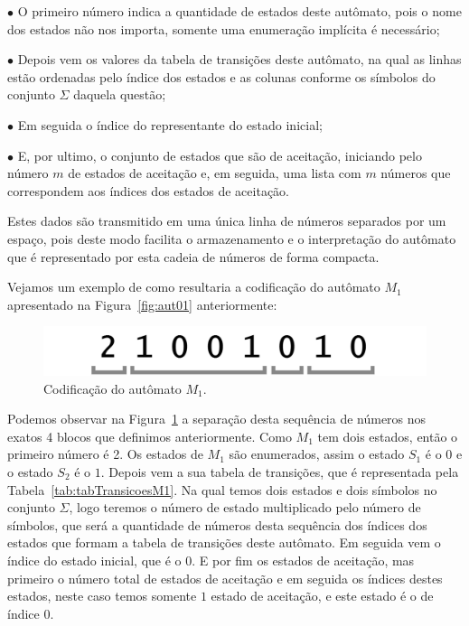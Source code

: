 \documentclass[
	12pt,				%
	openany,
	oneside,
	a4paper,			%
	english,			%
	brazil				%
	]{abntex2}
\begin{document}
\begin{alineas}
  \item[$\bullet$] O primeiro número indica a quantidade de estados deste autômato, pois o nome dos estados não nos importa, somente uma enumeração implícita é necessário;
  \item[$\bullet$] Depois vem os valores da tabela de transições deste autômato, na qual as linhas estão ordenadas pelo índice dos estados e as colunas conforme os símbolos do conjunto $\Sigma$ daquela questão;
  \item[$\bullet$] Em seguida o índice do representante do estado inicial;
  \item[$\bullet$] E, por ultimo, o conjunto de estados que são de aceitação, iniciando pelo número $m$ de estados de aceitação e, em seguida, uma lista com $m$ números que correspondem aos índices dos estados de aceitação.
\end{alineas}

  Estes dados são transmitido em uma única linha de números separados por um espaço, pois deste modo facilita o armazenamento e o interpretação do autômato que é representado por esta cadeia de números de forma compacta.

  Vejamos um exemplo de como resultaria a codificação do autômato $M_1$  apresentado na Figura~\ref{fig:aut01} anteriormente:

\begin{figure}[H]
  \centering
  \includegraphics[scale=0.3]{exemploCodificacao.png}
  \caption{Codificação do autômato $M_1$.}
  \label{fig:exemploCodificacao}
  \vspace{-0.5cm}
\end{figure}

  Podemos observar na Figura~\ref{fig:exemploCodificacao} a separação desta sequência de números nos exatos 4 blocos que definimos anteriormente. Como $M_1$ tem dois estados, então o primeiro número é 2. Os estados de $M_1$ são enumerados, assim o estado $S_1$ é o $0$ e o estado $S_2$ é o $1$. Depois vem a sua tabela de transições, que é representada pela Tabela~\ref{tab:tabTransicoesM1}. Na qual temos dois estados e dois símbolos no conjunto $\Sigma$, logo teremos o número de estado multiplicado pelo número de símbolos, que será a quantidade de números desta sequência dos índices dos estados que formam a tabela de transições deste autômato. %
  Em seguida vem o índice do estado inicial, que é o $0$. E por fim os estados de aceitação, mas primeiro o número total de estados de aceitação e em seguida os índices destes estados, neste caso temos somente $1$ estado de aceitação, e este estado é o de índice $0$.
\end{document}
